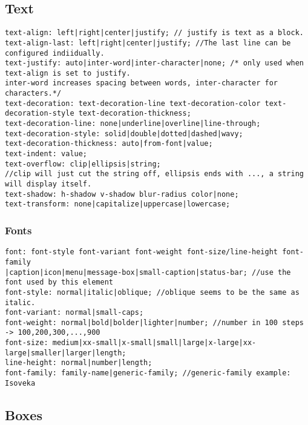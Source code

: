 \documentclass[main.tex,fontsize=6pt,paper=a4,paper=landscape,DIV=calc,]{scrartcl}
\begin{document}
\begin{multicols*}{4}
\subsection{Text}
\vspace{-2mm}
\begin{lstlisting}
text-align: left|right|center|justify; // justify is text as a block.
text-align-last: left|right|center|justify; //The last line can be configured indiidually.
text-justify: auto|inter-word|inter-character|none; /* only used when text-align is set to justify.
inter-word increases spacing between words, inter-character for characters.*/
text-decoration: text-decoration-line text-decoration-color text-decoration-style text-decoration-thickness;
text-decoration-line: none|underline|overline|line-through;
text-decoration-style: solid|double|dotted|dashed|wavy;
text-decoration-thickness: auto|from-font|value;
text-indent: value;
text-overflow: clip|ellipsis|string; 
//clip will just cut the string off, ellipsis ends with ..., a string will display itself.
text-shadow: h-shadow v-shadow blur-radius color|none;
text-transform: none|capitalize|uppercase|lowercase;
\end{lstlisting}
\vspace{2mm}

\subsubsection{Fonts}
\vspace{-2mm}
\begin{lstlisting}
font: font-style font-variant font-weight font-size/line-height font-family
|caption|icon|menu|message-box|small-caption|status-bar; //use the font used by this element
font-style: normal|italic|oblique; //oblique seems to be the same as italic.
font-variant: normal|small-caps;
font-weight: normal|bold|bolder|lighter|number; //number in 100 steps -> 100,200,300,...,900
font-size: medium|xx-small|x-small|small|large|x-large|xx-large|smaller|larger|length;
line-height: normal|number|length;
font-family: family-name|generic-family; //generic-family example: Isoveka
\end{lstlisting}
\vspace{2mm}

\subsection{Boxes}

\end{multicols*}
\end{document}
